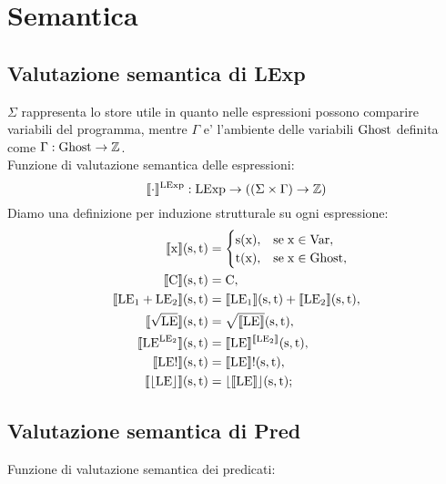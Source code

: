 \documentclass[a4paper, 12pt, oneside,fleqn]{book}
\begin{document}
\chapter{Semantica}
\section{Valutazione semantica di LExp}
$\Sigma$ rappresenta lo store utile in quanto nelle espressioni possono comparire variabili del programma, mentre $\Gamma$ e' l'ambiente delle variabili $\mathrm{Ghost}$ definita come $\Gamma\mathrel{:}\mathrm{Ghost}\rightarrow\mathbb{Z}$.\\
Funzione di valutazione semantica delle espressioni:
$$\llbracket\cdot\rrbracket ^{\mathrm{LExp}}: \mathrm{LExp} \rightarrow ((\Sigma \times \Gamma) \rightarrow \mathbb{Z})$$
Diamo una definizione per induzione strutturale su ogni espressione:
\begin{align}
\llbracket \mathrm{x}\rrbracket(\mathrm{s},\mathrm{t}) &=
        \begin{cases}
                \mathrm{s}(\mathrm{x}), &\text{se}\hspace{1mm} \mathrm{x}\in\mathrm{Var},  \\  \mathrm{t}(\mathrm{x}), &\text{se}\hspace{1mm} \mathrm{x}\in\mathrm{Ghost},
        \end{cases}\\
\llbracket \mathrm{C}\rrbracket(\mathrm{s},\mathrm{t}) &= \mathrm{C},\\
\llbracket \mathrm{LE}{_1}+\mathrm{LE}{_2} \rrbracket(\mathrm{s},\mathrm{t}) &= \llbracket \mathrm{LE}{_1} \rrbracket(\mathrm{s},\mathrm{t}) + \llbracket \mathrm{LE}{_2}\rrbracket(\mathrm{s},\mathrm{t}),\\
\llbracket \sqrt{\mathrm{LE}} \rrbracket(\mathrm{s},\mathrm{t}) &= \sqrt{\llbracket\mathrm{LE}\rrbracket}(\mathrm{s},\mathrm{t}),\\
\llbracket \mathrm{LE}^{\mathrm{LE}{_2}}\rrbracket(\mathrm{s},\mathrm{t}) &= \llbracket\mathrm{LE}\rrbracket^{\llbracket\mathrm{LE}{_2}\rrbracket}(\mathrm{s},\mathrm{t}),\\
\llbracket \mathrm{LE}!\rrbracket(\mathrm{s},\mathrm{t}) &= \llbracket\mathrm{LE}\rrbracket!(\mathrm{s},\mathrm{t}),\\
\llbracket \lfloor \mathrm{LE} \rfloor\rrbracket(\mathrm{s},\mathrm{t}) &= \lfloor\llbracket \mathrm{LE} \rrbracket\rfloor(\mathrm{s},\mathrm{t});
\end{align}
\section{Valutazione semantica di Pred}
Funzione di valutazione semantica dei predicati:
\end{document}

